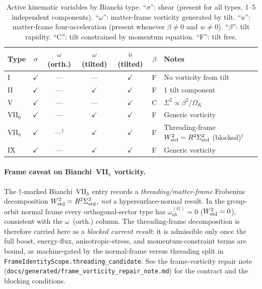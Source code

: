 \begin{table}[ht]
\caption{Active kinematic variables by Bianchi type.
``$\sigma$'': shear (present for all types, 1--5 independent
components). ``$\omega$'': matter-frame vorticity generated by
tilt. ``$\dot{u}$'': matter-frame four-acceleration (present
whenever $\beta \neq 0$ and $w \neq 0$). ``$\beta$'': tilt
rapidity. ``C'': tilt constrained by momentum equation.
``F'': tilt free.}
\label{tab:kin-by-type}
\centering\footnotesize\setlength{\tabcolsep}{4pt}
\begin{tabular}{lcccccl}
\toprule
Type & $\sigma$ & $\omega$ (orth.) & $\omega$ (tilted)
  & $\dot{u}$ (tilted) & $\beta$ & Notes \\
\midrule
I      & $\checkmark$ & --- & ---
  & $\checkmark$ & F & No vorticity from tilt \\
II     & $\checkmark$ & --- & $\checkmark$
  & $\checkmark$ & F & 1 tilt component \\
V      & $\checkmark$ & --- & ---
  & $\checkmark$ & C & $\Sigma^2 \propto \beta^2/\Omega_K$ \\
VII$_0$& $\checkmark$ & --- & $\checkmark$
  & $\checkmark$ & F & Generic vorticity \\
VII$_h$& $\checkmark$ & ---$^{\dagger}$ & $\checkmark$
  & $\checkmark$ & F & Threading-frame $W^2_{\mathrm{std}}=R^2\Sigma^2_{\mathrm{std}}$ (blocked)$^{\dagger}$ \\
IX     & $\checkmark$ & --- & $\checkmark$
  & $\checkmark$ & F & Generic vorticity \\
\bottomrule
\end{tabular}
\end{table}

\paragraph{Frame caveat on Bianchi~VII$_h$ vorticity.}
The $\dagger$-marked Bianchi~VII$_h$ entry records a
\emph{threading/matter-frame} Frobenius decomposition
$W^2_{\mathrm{std}} = R^2\Sigma^2_{\mathrm{std}}$, \emph{not} a hypersurface-normal result.  In the
group-orbit normal frame every orthogonal-sector type has
$\omega_{ab}^{(G)} = 0$ ($W^2_{\mathrm{std}} = 0$), consistent with the
$\omega$~(orth.) column.  The threading-frame decomposition is therefore
carried here as a \emph{blocked current result}: it is admissible only once the
full boost, energy-flux, anisotropic-stress, and momentum-constraint terms are
bound, as machine-gated by the normal-frame versus threading split in
\texttt{FrameIdentityScope.threading\_candidate}.  See the frame-vorticity
repair note (\texttt{docs/generated/frame\_vorticity\_repair\_note.md}) for the
contract and the blocking conditions.


